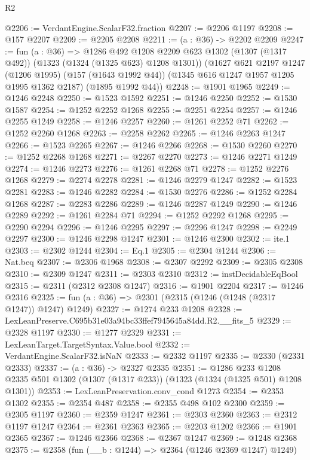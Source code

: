 \begin{lexlean}{R2}
\begin{coremodule}
@2206 := VerdantEngine.ScalarF32.fraction
@2207 := @2206 @1197
@2208 := @157 @2207
@2209 := @2205 @2208
@2211 := (a : @36) -> @2202 @2209
@2247 := fun (a : @36) =>
  @1286
    @492
    @1208
    @2209
    @623
    @1302
    (@1307 (@1317 @492))
    (@1323 (@1324 (@1325 @623) @1208 @1301))
    (@1627
      @621
      @2197
      @1247
      (@1206 @1995)
      (@157 (@1643 @1992 @44))
      (@1345 @616 @1247 @1957 @1205 @1995 @1362 @2187)
      (@1895 @1992 @44))
@2248 := @1901 @1965
@2249 := @1246 @2248
@2250 := @1523 @1592
@2251 := @1246 @2250
@2252 := @1530 @1587
@2254 := @1252 @2252 @1268
@2255 := @2251 @2254
@2257 := @1246 @2255 @1249
@2258 := @1246 @2257
@2260 := @1261 @2252 @71
@2262 := @1252 @2260 @1268
@2263 := @2258 @2262
@2265 := @1246 @2263 @1247
@2266 := @1523 @2265
@2267 := @1246 @2266
@2268 := @1530 @2260
@2270 := @1252 @2268 @1268
@2271 := @2267 @2270
@2273 := @1246 @2271 @1249
@2274 := @1246 @2273
@2276 := @1261 @2268 @71
@2278 := @1252 @2276 @1268
@2279 := @2274 @2278
@2281 := @1246 @2279 @1247
@2282 := @1523 @2281
@2283 := @1246 @2282
@2284 := @1530 @2276
@2286 := @1252 @2284 @1268
@2287 := @2283 @2286
@2289 := @1246 @2287 @1249
@2290 := @1246 @2289
@2292 := @1261 @2284 @71
@2294 := @1252 @2292 @1268
@2295 := @2290 @2294
@2296 := @1246 @2295
@2297 := @2296 @1247
@2298 := @2249 @2297
@2300 := @1246 @2298 @1247
@2301 := @1246 @2300
@2302 := ite.{1}
@2303 := @2302 @1244
@2304 := Eq.{1}
@2305 := @2304 @1244
@2306 := Nat.beq
@2307 := @2306 @1968
@2308 := @2307 @2292
@2309 := @2305 @2308
@2310 := @2309 @1247
@2311 := @2303 @2310
@2312 := instDecidableEqBool
@2315 := @2311 (@2312 @2308 @1247)
@2316 := @1901 @2204
@2317 := @1246 @2316
@2325 := fun (a : @36) => @2301 (@2315 (@1246 (@1248 (@2317 @1247)) @1247) @1249)
@2327 := @1274 @233 @1208
@2328 := LexLeanPreserve.C695b31e03a94bc33ffef7945645a84dd.R2.__fits_5
@2329 := @2328 @1197
@2330 := @1277 @2329
@2331 := LexLeanTarget.TargetSyntax.Value.bool
@2332 := VerdantEngine.ScalarF32.isNaN
@2333 := @2332 @1197
@2335 := @2330 (@2331 @2333)
@2337 := (a : @36) -> @2327 @2335
@2351 := @1286
    @233
    @1208
    @2335
    @501
    @1302
    (@1307 (@1317 @233))
    (@1323 (@1324 (@1325 @501) @1208 @1301))
@2353 := LexLeanPreservation.conv_cond @1273
@2354 := @2353 @1302
@2355 := @2354 @487
@2358 := @2355 @498 @102 @2300
@2359 := @2305 @1197
@2360 := @2359 @1247
@2361 := @2303 @2360
@2363 := @2312 @1197 @1247
@2364 := @2361 @2363
@2365 := @2203 @1202
@2366 := @1901 @2365
@2367 := @1246 @2366
@2368 := @2367 @1247
@2369 := @1248 @2368
@2375 := @2358 (fun (__b : @1244) => @2364 (@1246 @2369 @1247) @1249)

\end{coremodule}
\end{lexlean}
